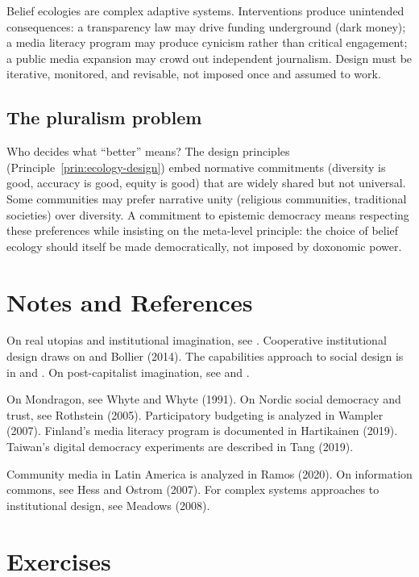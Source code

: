 Belief ecologies are complex adaptive systems.
Interventions produce unintended consequences: a transparency law may drive funding underground (dark money); a media literacy program may produce cynicism rather than critical engagement; a public media expansion may crowd out independent journalism.
Design must be iterative, monitored, and revisable, not imposed once and assumed to work.

\subsection{The pluralism problem}

Who decides what ``better'' means?
The design principles (Principle~\ref{prin:ecology-design}) embed normative commitments (diversity is good, accuracy is good, equity is good) that are widely shared but not universal.
Some communities may prefer narrative unity (religious communities, traditional societies) over diversity.
A commitment to epistemic democracy means respecting these preferences while insisting on the meta-level principle: the choice of belief ecology should itself be made democratically, not imposed by doxonomic power.

\section{Notes and References}
\label{sec:ch33-notes}

On real utopias and institutional imagination, see \textcite{wright2010}.
Cooperative institutional design draws on \textcite{ostrom1990} and Bollier (2014).
The capabilities approach to social design is in \textcite{sen1999} and \textcite{nussbaum2011}.
On post-capitalist imagination, see \textcite{mason2015} and \textcite{srnicek2015}.

On Mondragon, see Whyte and Whyte (1991).
On Nordic social democracy and trust, see Rothstein (2005).
Participatory budgeting is analyzed in Wampler (2007).
Finland's media literacy program is documented in Hartikainen (2019).
Taiwan's digital democracy experiments are described in Tang (2019).

Community media in Latin America is analyzed in Ramos (2020).
On information commons, see Hess and Ostrom (2007).
For complex systems approaches to institutional design, see Meadows (2008).

\section{Exercises}

